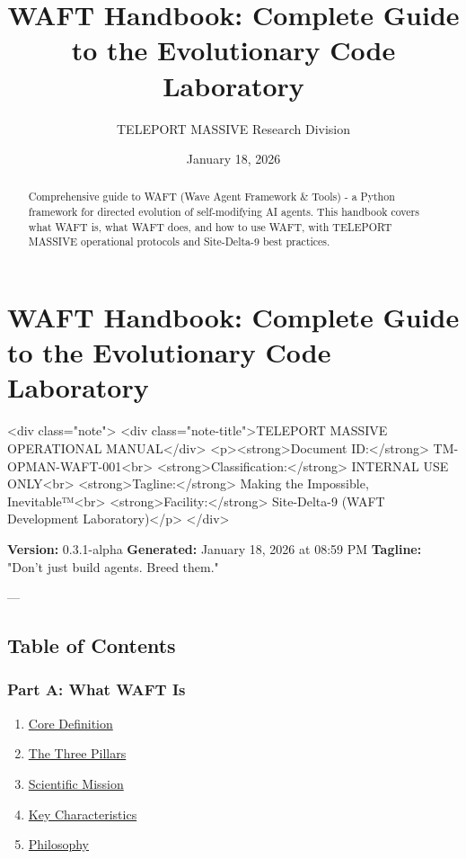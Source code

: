 \documentclass{article}
\title{WAFT Handbook: Complete Guide to the Evolutionary Code Laboratory}
\author{TELEPORT MASSIVE Research Division}
\date{January 18, 2026}
\begin{document}
\maketitle

\begin{abstract}
Comprehensive guide to WAFT (Wave Agent Framework & Tools) - a Python framework for directed evolution of self-modifying AI agents. This handbook covers what WAFT is, what WAFT does, and how to use WAFT, with TELEPORT MASSIVE operational protocols and Site-Delta-9 best practices.
\end{abstract}


\section{WAFT Handbook: Complete Guide to the Evolutionary Code Laboratory}

<div class="note">
    <div class="note-title">TELEPORT MASSIVE OPERATIONAL MANUAL</div>
    <p><strong>Document ID:</strong> TM-OPMAN-WAFT-001<br>
    <strong>Classification:</strong> INTERNAL USE ONLY<br>
    <strong>Tagline:</strong> Making the Impossible, Inevitable™<br>
    <strong>Facility:</strong> Site-Delta-9 (WAFT Development Laboratory)</p>
</div>

\textbf{Version:} 0.3.1-alpha  
\textbf{Generated:} January 18, 2026 at 08:59 PM  
\textbf{Tagline:} "Don't just build agents. Breed them."

---

\subsection{Table of Contents}

\subsubsection{Part A: What WAFT Is}
\begin{enumerate}
\item \href{#core-definition}{Core Definition}
\item \href{#the-three-pillars}{The Three Pillars}
\item \href{#scientific-mission}{Scientific Mission}
\item \href{#key-characteristics}{Key Characteristics}
\item \href{#philosophy}{Philosophy}
\end{enumerate}
\end{document}
